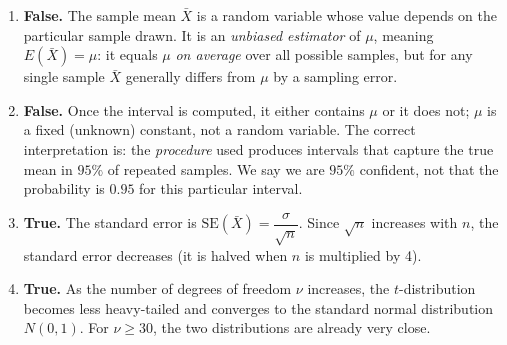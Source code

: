 \documentclass[11pt]{article}
\begin{document}
\begin{corrige}
\begin{enumerate}
\item \textbf{False.} The sample mean $\bar{X}$ is a random variable whose value depends on the particular sample drawn. It is an \emph{unbiased estimator} of $\mu$, meaning $E(\bar{X}) = \mu$: it equals $\mu$ \emph{on average} over all possible samples, but for any single sample $\bar{X}$ generally differs from $\mu$ by a sampling error.
\item \textbf{False.} Once the interval is computed, it either contains $\mu$ or it does not; $\mu$ is a fixed (unknown) constant, not a random variable. The correct interpretation is: the \emph{procedure} used produces intervals that capture the true mean in $95\%$ of repeated samples. We say we are $95\%$ confident, not that the probability is $0.95$ for this particular interval.
\item \textbf{True.} The standard error is $\mathrm{SE}(\bar{X}) = \dfrac{\sigma}{\sqrt{n}}$. Since $\sqrt{n}$ increases with $n$, the standard error decreases (it is halved when $n$ is multiplied by 4).
\item \textbf{True.} As the number of degrees of freedom $\nu$ increases, the $t$-distribution becomes less heavy-tailed and converges to the standard normal distribution $N(0,1)$. For $\nu \geq 30$, the two distributions are already very close.
\end{enumerate}
\end{corrige}
\end{document}
